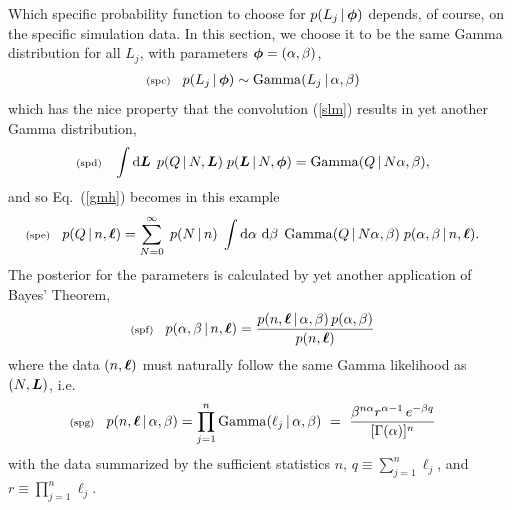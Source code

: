 \documentclass[11pt]{article}
\newcommand{\lleq}[1]{\label{#1} }
\renewcommand{\lleq}[1]{\label{#1} {\scriptstyle {\rm (#1)}} \hspace*{2ex} }
\newcommand{\cond}{\,|\,}
\DeclareMathOperator{\GammaDist}{Gamma}
\newcommand{\rmdx}[1]{\dd{#1}} %
\begin{document}
Which specific probability function to choose for $p(L_j\cond\bmphi)$
depends, of course, on the specific simulation data. In this section,
we choose it to be the same Gamma distribution for all $L_j$,
with parameters ${\bm{\phi}} = (\alpha,\beta)$,
\begin{align}
  \lleq{spc}
  p(L_j\cond \bmphi) &\sim \GammaDist(L_j\cond \alpha,\beta)
\end{align}
which has the nice property that the convolution (\ref{slm}) results
in yet another Gamma distribution,
\begin{align}
  \lleq{spd}
  \int \rmdx{\bmL}\; p(Q\cond N,\bmL)\; p(\bmL\cond N,\bmphi)
  &= \GammaDist(Q\cond N\alpha, \beta),
\end{align}
and so Eq.~(\ref{gmh}) becomes in this example
\begin{align}
  \lleq{spe}
  p(Q\cond n,\bml)
  &= \sum_{N=0}^\infty \;
    p(N\cond n)\;
    \int \rmdx{\alpha}\,\rmdx{\beta}\;
    \GammaDist(Q\cond N\alpha, \beta)\;
    p(\alpha,\beta\cond n,\bml).
\end{align}
The posterior for the parameters is calculated by yet another
application of Bayes' Theorem,
\begin{align}
  \lleq{spf}
  p(\alpha,\beta\cond n,\bml)
  &= \frac{p(n,\bml\cond \alpha,\beta)\,p(\alpha,\beta)}{p(n,\bml)}
\end{align}
where the data $(n,{\bm{\ell}})$ must naturally follow the same
Gamma likelihood as $(N,{\bm{L}})$, i.e.\
\begin{align}
  \lleq{spg}
  p(n,\bml\cond \alpha,\beta)
  & = \prod_{j=1}^n \GammaDist(\ell_j\cond\alpha,\beta)
    \ =\ \frac{\beta^{n\alpha} r^{\alpha-1}\,e^{-\beta q}}{[\Gamma(\alpha)]^n}
\end{align}
with the data summarized by the sufficient statistics $n$,
$q \equiv \sum_{j=1}^n \ell_j$, and $r \equiv \prod_{j=1}^n \ell_j$.
\end{document}

